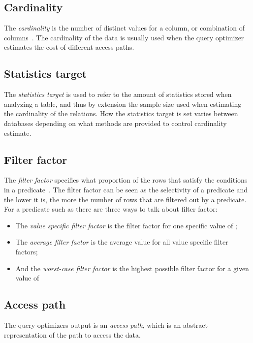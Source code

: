 \subsection*{Cardinality}
The \textit{cardinality} is the number of distinct values for a column, or
combination of columns~\cite{lahdenmaki_2005_relational_rdidatodossea}. The
cardinality of the data is usually used when the query optimizer estimates the
cost of different access paths.

\subsection*{Statistics target}
The \textit{statistics target} is used to refer to the amount of statistics
stored when analyzing a table, and thus by extension the sample size used when
estimating the cardinality of the relations. How the statistics target is set
varies between databases depending on what methods are provided to control
cardinality estimate.

\subsection*{Filter factor}
The \textit{filter factor} specifies what proportion of the rows that    satisfy
the conditions in a predicate~\cite{lahdenmaki_2005_relational_rdidatodossea}.
The filter factor can be seen as the selectivity of a predicate and the lower it
is, the more the number of rows that are filtered out by a predicate. For a
predicate such as  there are three ways to talk about
filter factor:
\begin{itemize}
\item The \textit{value specific filter factor} is the filter factor for one
  specific value of ;
\item The \textit{average filter factor} is the average value for all value
  specific filter factors;
\item And the \textit{worst-case filter factor} is the highest possible filter
  factor for a given value of 
\end{itemize}

\subsection*{Access path}
The query optimizers output is an \textit{access path}, which is an abstract
representation of the path to access the data.

